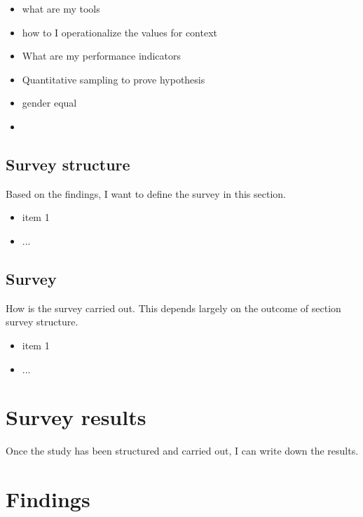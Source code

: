             \begin{itemize}
                \item what are my tools
                \item how to I operationalize the values for context
                \item What are my performance indicators
                \item Quantitative sampling to prove hypothesis
                \item gender equal
                \item 
            \end{itemize}

        \section{Survey structure}

            Based on the findings, I want to define the survey in this section.

            \begin{itemize}
                \item item 1
                \item ...
            \end{itemize}

        \section{Survey}

            How is the survey carried out. This depends largely on the outcome of section survey structure.

            \begin{itemize}
                \item item 1
                \item ...
            \end{itemize}

    \chapter{Survey results}

        Once the study has been structured and carried out, I can write down the results.

    \chapter{Findings}

